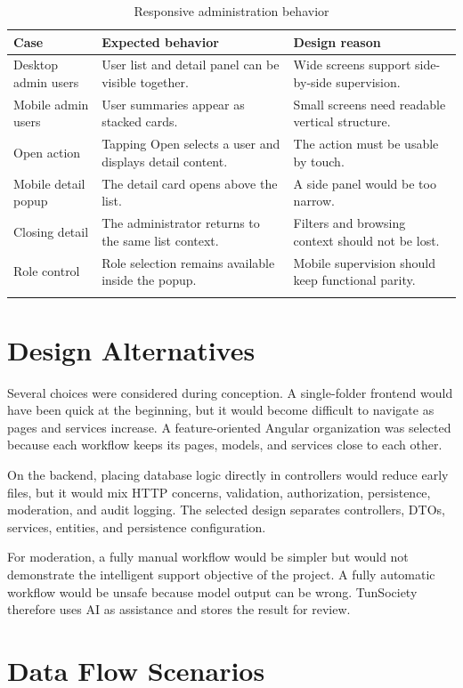 \begin{longtable}{|m{3.4cm}|m{5.2cm}|m{5.5cm}|}
\hline
\textbf{Case} & \textbf{Expected behavior} & \textbf{Design reason} \\
\hline
Desktop admin users & User list and detail panel can be visible together. & Wide screens support side-by-side supervision. \\
\hline
Mobile admin users & User summaries appear as stacked cards. & Small screens need readable vertical structure. \\
\hline
Open action & Tapping Open selects a user and displays detail content. & The action must be usable by touch. \\
\hline
Mobile detail popup & The detail card opens above the list. & A side panel would be too narrow. \\
\hline
Closing detail & The administrator returns to the same list context. & Filters and browsing context should not be lost. \\
\hline
Role control & Role selection remains available inside the popup. & Mobile supervision should keep functional parity. \\
\hline
\caption{Responsive administration behavior}
\end{longtable}

\section{Design Alternatives}

Several choices were considered during conception. A single-folder frontend would have been quick at the beginning, but it would become difficult to navigate as pages and services increase. A feature-oriented Angular organization was selected because each workflow keeps its pages, models, and services close to each other.

On the backend, placing database logic directly in controllers would reduce early files, but it would mix HTTP concerns, validation, authorization, persistence, moderation, and audit logging. The selected design separates controllers, DTOs, services, entities, and persistence configuration.

For moderation, a fully manual workflow would be simpler but would not demonstrate the intelligent support objective of the project. A fully automatic workflow would be unsafe because model output can be wrong. TunSociety therefore uses AI as assistance and stores the result for review.

\section{Data Flow Scenarios}

